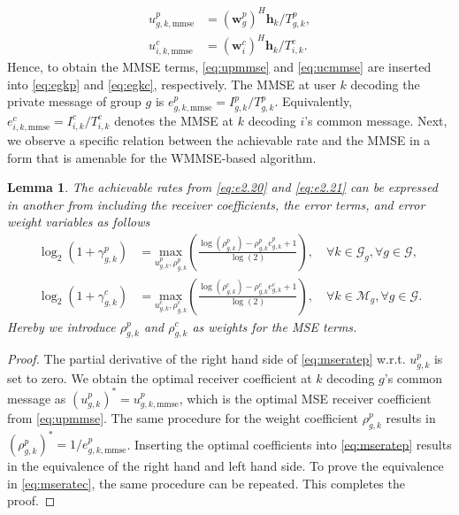 \documentclass[12pt,draftcls,onecolumn]{IEEEtran}
\newtheorem{lemma}{Lemma}
\theoremstyle{remark}
\theoremstyle{definition}
\begin{document}
{\begin{align}
	u_{g,k,\text{mmse}}^p &= (\mathbf{w}_g^p)^H \mathbf{h}_k / T_{g,k}^p, \label{eq:upmmse}\\
	u_{i,k,\text{mmse}}^c &= (\mathbf{w}_i^c)^H \mathbf{h}_k / T_{i,k}^c. \label{eq:ucmmse}
\end{align}
Hence, to obtain the MMSE terms, \eqref{eq:upmmse} and \eqref{eq:ucmmse} are inserted into \eqref{eq:egkp} and \eqref{eq:egkc}, respectively. The MMSE at user $k$ decoding the private message of group $g$ is $e_{g,k,\text{mmse}}^p = I_{g,k}^p / T_{g,k}^p$. Equivalently, $e_{i,k,\text{mmse}}^c = I_{i,k}^c / T_{i,k}^c$ denotes the MMSE at $k$ decoding $i$'s common message. Next, we observe a specific relation between the achievable rate and the MMSE in a form that is amenable for the WMMSE-based algorithm.
\begin{lemma}
	The achievable rates from \eqref{eq:e2.20} and \eqref{eq:e2.21} can be expressed in another from including the receiver coefficients, the error terms, and error weight variables as follows
	\begin{align}
		\log_2(1+\gamma_{g,k}^p) &= \underset{u_{g,k}^p,\rho_{g,k}^p}{\text{max}} \left( \frac{\log(\rho_{g,k}^p)-\rho_{g,k}^p e_{g,k}^p + 1}{\log(2)} \right), \quad \forall k \in \mathcal{G}_g, \forall g \in \mathcal{G} \label{eq:mseratep},\\
		\log_2(1+\gamma_{g,k}^c) &= \underset{u_{g,k}^c,\rho_{g,k}^c}{\text{max}} \left( \frac{\log(\rho_{g,k}^c)-\rho_{g,k}^c e_{g,k}^c + 1}{\log(2)} \right), \quad \forall k \in \mathcal{M}_g, \forall g \in \mathcal{G} \label{eq:mseratec}.
	\end{align}
	Hereby we introduce $\rho_{g,k}^p$ and $\rho_{g,k}^c$ as weights for the MSE terms.
\end{lemma}
\begin{proof}
	The partial derivative of the right hand side of \eqref{eq:mseratep} w.r.t. $u_{g,k}^p$ is set to zero. We obtain the optimal receiver coefficient at $k$ decoding $g$'s common message as $(u_{g,k}^p)^* = u_{g,k,\text{mmse}}^p$, which is the optimal MSE receiver coefficient from \eqref{eq:upmmse}. The same procedure for the weight coefficient $\rho_{g,k}^p$ results in $(\rho_{g,k}^p)^* = 1/{e_{g,k,\text{mmse}}^p}$. Inserting the optimal coefficients into \eqref{eq:mseratep} results in the equivalence of the right hand and left hand side. To prove the equivalence in \eqref{eq:mseratec}, the same procedure can be repeated. This completes the proof.

\end{proof}}
\end{document}

